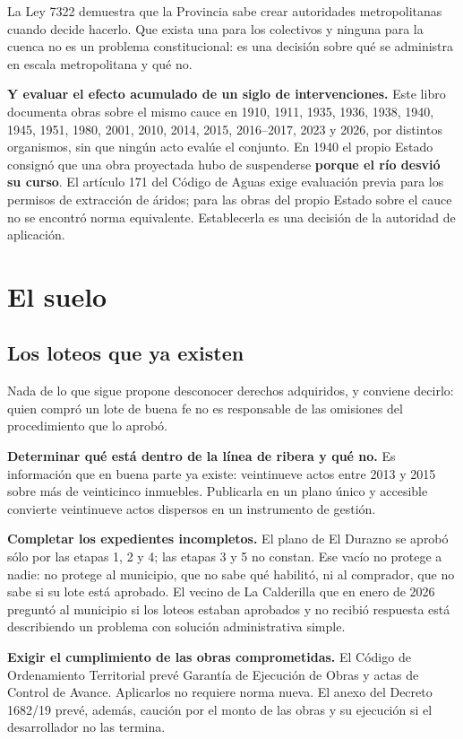 La Ley 7322 demuestra que la Provincia sabe crear autoridades metropolitanas cuando decide
hacerlo. Que exista una para los colectivos y ninguna para la cuenca no es un problema
constitucional: es una decisión sobre qué se administra en escala metropolitana y qué no.

\textbf{Y evaluar el efecto acumulado de un siglo de intervenciones.} Este libro documenta
obras sobre el mismo cauce en 1910, 1911, 1935, 1936, 1938, 1940, 1945, 1951, 1980, 2001, 2010, 2014, 2015, 2016--2017, 2023 y 2026, por
distintos organismos, sin que ningún acto evalúe el conjunto. En 1940 el propio Estado
consignó que una obra proyectada hubo de suspenderse \textbf{porque el río desvió su curso}.
El artículo 171 del Código de Aguas exige evaluación previa para los permisos de extracción
de áridos; para las obras del propio Estado sobre el cauce no se encontró norma equivalente.
Establecerla es una decisión de la autoridad de aplicación.

\section{El suelo}

\subsection*{Los loteos que ya existen}

Nada de lo que sigue propone desconocer derechos adquiridos, y conviene decirlo: quien compró
un lote de buena fe no es responsable de las omisiones del procedimiento que lo aprobó.

\textbf{Determinar qué está dentro de la línea de ribera y qué no.} Es información que en
buena parte ya existe: veintinueve actos entre 2013 y 2015 sobre más de veinticinco inmuebles.
Publicarla en un plano único y accesible convierte veintinueve actos dispersos en un
instrumento de gestión.

\textbf{Completar los expedientes incompletos.} El plano de El Durazno se aprobó sólo por las
etapas 1, 2 y 4; las etapas 3 y 5 no constan. Ese vacío no protege a nadie: no protege al
municipio, que no sabe qué habilitó, ni al comprador, que no sabe si su lote está aprobado.
El vecino de La Calderilla que en enero de 2026 preguntó al municipio si los loteos estaban
aprobados y no recibió respuesta está describiendo un problema con solución administrativa
simple.

\textbf{Exigir el cumplimiento de las obras comprometidas.} El Código de Ordenamiento
Territorial prevé Garantía de Ejecución de Obras y actas de Control de Avance. Aplicarlos no
requiere norma nueva. El anexo del Decreto 1682/19 prevé, además, caución por el monto de las obras y su ejecución si el desarrollador no las termina.

